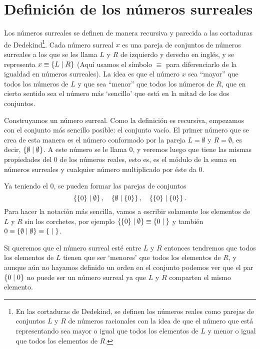     
    
\section{Definici\'on de los n\'umeros surreales}

    Los números surreales se definen de manera recursiva y parecida a las cortaduras de Dedekind\footnote{En las cortaduras de Dedekind, se definen los n\'umeros reales como parejas de conjuntos $L$ y $R$ de n\'umeros racionales con la idea de que el n\'umero que est\'a representando sea mayor o igual que todos los elementos de $L$ y menor o igual que todos los elementos de $R$.}. Cada n\'umero surreal $x$ es una pareja de conjuntos de n\'umeros surreales a los que se les llama $L$ y $R$ de izquierdo y derecho en ingl\'es, y se representa $x \equiv \left\{L\;\middle|\; R\right\}$ (Aqu\'i usamos el s\'imbolo $\equiv$ para diferenciarlo de la igualdad en n\'umeros surreales). La idea es que el n\'umero $x$ sea ``mayor'' que todos los n\'umeros de $L$ y que sea ``menor'' que todos los n\'umeros de $R$, que en cierto sentido sea el n\'umero m\'as `sencillo' que est\'a en la mitad de los dos conjuntos.

    Construyamos un n\'umero surreal. Como la definici\'on es recursiva, empezamos con el conjunto m\'as sencillo posible: el conjunto vac\'io. El primer n\'umero que se crea de esta manera es el n\'umero conformado por la pareja $L = \emptyset$ y $R=\emptyset$, es decir, $\left\{\emptyset\;\middle|\; \emptyset\right\}$. A este n\'umero se le llama $0$, y veremos luego que tiene las mismas propiedades del $0$ de los n\'umeros reales, esto es, es el m\'odulo de la suma en n\'umeros surreales y cualquier n\'umero multiplicado por \'este da $0$.

    Ya teniendo el $0$, se pueden formar las parejas de conjuntos
    \[
        \left\{\{0\}\;\middle|\; \emptyset\right\}, \quad \left\{\emptyset\;\middle|\; \{0\}\right\}, \quad \left\{\{0\}\;\middle|\; \{0\}\right\}.
    \]
    Para hacer la notaci\'on m\'as sencilla, vamos a escribir solamente los elementos de $L$ y $R$ sin los corchetes, por ejemplo $\left\{\{0\}\;\middle|\; \emptyset\right\} \equiv \left\{0\;\middle|\; \right\}$ y tambi\'en $0 \equiv \left\{\emptyset\;\middle|\; \emptyset\right\} \equiv \left\{\;\middle|\; \right\}$.

    Si queremos que el n\'umero surreal est\'e entre $L$ y $R$ entonces tendremos que todos los elementos de $L$ tienen que ser `menores' que todos los elementos de $R$, y aunque a\'un no hayamos definido un orden en el conjunto podemos ver que el par $\left\{0\;\middle|\; 0\right\}$ no puede ser un n\'umero surreal ya que $L$ y $R$ comparten el mismo elemento.

